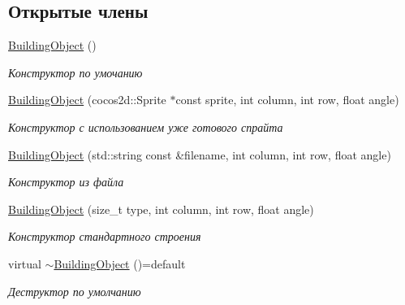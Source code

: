 \subsection*{Открытые члены}
\begin{DoxyCompactItemize}
\item 
\mbox{\label{classrtm_1_1_building_object_a03e7024f6e30929fd991bd811d6a7766}} 
\hyperlink{classrtm_1_1_building_object_a03e7024f6e30929fd991bd811d6a7766}{Building\+Object} ()
\begin{DoxyCompactList}\small\item\em Конструктор по умочанию \end{DoxyCompactList}\item 
\hyperlink{classrtm_1_1_building_object_a972c352ad972bec2381137299a95045c}{Building\+Object} (cocos2d\+::\+Sprite $\ast$const sprite, int column, int row, float angle)
\begin{DoxyCompactList}\small\item\em Конструктор с использованием уже готового спрайта \end{DoxyCompactList}\item 
\hyperlink{classrtm_1_1_building_object_a8507652023a31117c99593625011a456}{Building\+Object} (std\+::string const \&filename, int column, int row, float angle)
\begin{DoxyCompactList}\small\item\em Конструктор из файла \end{DoxyCompactList}\item 
\hyperlink{classrtm_1_1_building_object_a3785e78d68f62e698013091d436e943d}{Building\+Object} (size\+\_\+t type, int column, int row, float angle)
\begin{DoxyCompactList}\small\item\em Конструктор стандартного строения \end{DoxyCompactList}\item 
\mbox{\label{classrtm_1_1_building_object_a6c339422b4b701fb1e3208ad4a9f737a}} 
virtual \hyperlink{classrtm_1_1_building_object_a6c339422b4b701fb1e3208ad4a9f737a}{$\sim$\+Building\+Object} ()=default
\begin{DoxyCompactList}\small\item\em Деструктор по умолчанию \end{DoxyCompactList}\end{DoxyCompactItemize}

